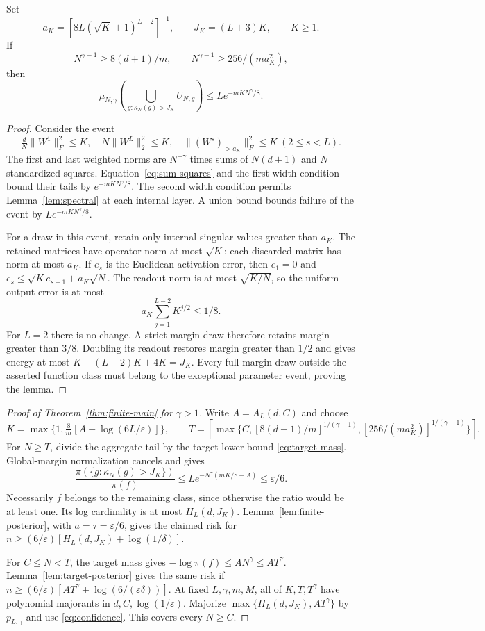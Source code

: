 \begin{lemma}\label{lem:structural}
Set
\[
 a_K=[8L(\sqrt K+1)^{L-2}]^{-1},\qquad J_K=(L+3)K,
 \qquad K\geq1.
\]
If
\begin{equation}\label{eq:width-above}
 N^{\gamma-1}\geq8(d+1)/m,\qquad
 N^{\gamma-1}\geq256/(ma_K^2),
\end{equation}
then
\[
 \mu_{N,\gamma}\!\left(\bigcup_{g:\kappa_N(g)>J_K}U_{N,g}\right)
 \leq L e^{-mKN^\gamma/8}.
\]
\end{lemma}
\begin{proof}
Consider the event
\[
 \tfrac dN\|W^1\|_F^2\leq K,\quad
 N\|W^L\|_2^2\leq K,\quad
 \|(W^s)_{>a_K}\|_F^2\leq K\ (2\leq s<L).
\]
The first and last weighted norms are $N^{-\gamma}$ times sums of
$N(d+1)$ and $N$ standardized squares. Equation~\eqref{eq:sum-squares}
and the first width condition bound their tails by $e^{-mKN^\gamma/8}$.
The second width condition permits Lemma~\ref{lem:spectral} at each
internal layer. A union bound bounds failure of the event by
$Le^{-mKN^\gamma/8}$.

For a draw in this event, retain only internal singular values greater
than $a_K$. The retained matrices have operator norm at most $\sqrt K$;
each discarded matrix has norm at most $a_K$. If $e_s$ is the Euclidean
activation error, then $e_1=0$ and
$e_s\leq\sqrt K e_{s-1}+a_K\sqrt N$. The readout norm is at most
$\sqrt{K/N}$, so the uniform output error is at most
\[
 a_K\sum_{j=1}^{L-2}K^{j/2}\leq1/8.
\]
For $L=2$ there is no change. A strict-margin draw therefore retains
margin greater than $3/8$. Doubling its readout restores margin greater
than $1/2$ and gives energy at most
$K+(L-2)K+4K=J_K$. Every full-margin draw outside the asserted function
class must belong to the exceptional parameter event, proving the lemma.
\end{proof}

\begin{proof}[Proof of Theorem~\ref{thm:finite-main} for $\gamma>1$]
Write $A=A_L(d,C)$ and choose
\[
 K=\max\{1,\tfrac8m[A+\log(6L/\varepsilon)]\},\qquad
 T=\left\lceil\max\{C,[8(d+1)/m]^{1/(\gamma-1)},
                [256/(ma_K^2)]^{1/(\gamma-1)}\}\right\rceil.
\]
For $N\geq T$, divide the aggregate tail by the target lower bound
\eqref{eq:target-mass}. Global-margin normalization cancels and gives
\[
 \frac{\pi(\{g:\kappa_N(g)>J_K\})}{\pi(f)}
 \leq L e^{-N^\gamma(mK/8-A)}\leq\varepsilon/6.
\]
Necessarily $f$ belongs to the remaining class, since otherwise the ratio
would be at least one. Its log cardinality is at most $H_L(d,J_K)$.
Lemma~\ref{lem:finite-posterior}, with $a=\tau=\varepsilon/6$, gives
the claimed risk for
$n\geq(6/\varepsilon)[H_L(d,J_K)+\log(1/\delta)]$.

For $C\leq N<T$, the target mass gives
$-\log\pi(f)\leq AN^\gamma\leq AT^\gamma$.
Lemma~\ref{lem:target-posterior} gives the same risk if
$n\geq(6/\varepsilon)[AT^\gamma+\log(6/(\varepsilon\delta))]$.
At fixed $L,\gamma,m,M$, all of $K,T,T^\gamma$ have polynomial
majorants in $d,C,\log(1/\varepsilon)$. Majorize
$\max\{H_L(d,J_K),AT^\gamma\}$ by $p_{L,\gamma}$ and use
\eqref{eq:confidence}. This covers every $N\geq C$.
\end{proof}
